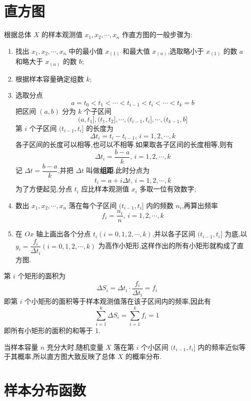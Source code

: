 \section{直方图}

根据总体 $X$ 的样本观测值 $x_1,x_2,\cdots,x_n$ 作直方图的一般步骤为:

\begin{enumerate}
    \item 找出 $x_1,x_2,\cdots,x_n$ 中的最小值 $x_{(1)}$ 和最大值 $x_{(n)}$,选取略小于 $x_{(1)}$ 的数 $a$ 和略大于 $x_{(n)}$ 的数 $b$;

    \item 根据样本容量确定组数 $k$;

    \item 选取分点
    $$
    a = t_0 < t_1 < \cdots < t_{i-1} < t_i < \cdots < t_k = b
    $$
    把区间 $(a,b)$ 分为 $k$ 个子区间
    $$
    (a, t_1], (t_1, t_2], \cdots, (t_{i-1}, t_i], \cdots, (t_{k-1}, b]
    $$
    第 $i$ 个子区间 $(t_{i-1}, t_i]$ 的长度为
    $$
    \Delta t_i = t_i - t_{i-1}, \, i=1,2,\cdots,k
    $$
    各子区间的长度可以相等,也可以不相等.如果取各子区间的长度相等,则有
    $$
    \Delta t_i = \dfrac{b-a}{k}, \, i=1,2,\cdots,k
    $$
    记 $\Delta t = \dfrac{b-a}{k}$,并把 $\Delta t$ 叫做\textbf{组距}.此时分点为
    $$
    t_i = a + i \Delta t, \, i=1,2,\cdots,k
    $$
    为了方便起见,分点 $t_i$ 应比样本观测值 $x_i$ 多取一位有效数字;

    \item 数出 $x_1,x_2,\cdots,x_n$ 落在每个子区间 $(t_{i-1}, t_i]$ 内的频数 $n_i$,再算出频率
    $$
    f_i = \dfrac{n_i}{n}, \, i=1,2,\cdots,k
    $$

    \item 在 $Ox$ 轴上画出各个分点 $t_i(i=0,1,2,\cdots,k)$,并以各子区间 $(t_{i-1}, t_i]$ 为底,以 $y_i = \dfrac{f_i}{\Delta t_i} (i=0,1,2,\cdots,k)$ 为高作小矩形,这样作出的所有小矩形就构成了直方图.
\end{enumerate}

\vspace{0.5em}

第 $i$ 个矩形的面积为
$$
\Delta S_i = \Delta t_i \cdot \dfrac{f_i}{\Delta t_i} = f_i
$$
即第 $i$ 个小矩形的面积等于样本观测值落在该子区间内的频率,因此有
$$
\sum_{i=1}^k \Delta S_i = \sum_{i=1}^k f_i = 1
$$
即所有小矩形的面积的和等于 1.

当样本容量 $n$ 充分大时,随机变量 $X$ 落在第 $i$ 个小区间 $(t_{i-1}, t_i]$ 内的频率近似等于其概率,所以直方图大致反映了总体 $X$ 的概率分布.

\section{样本分布函数}

